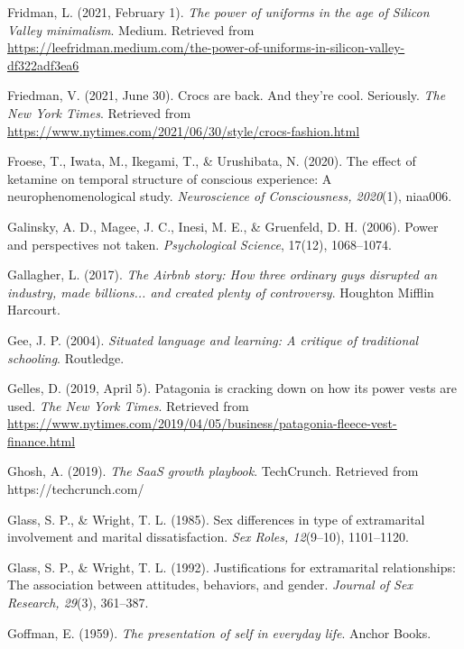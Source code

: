 \begin{thebibliography}{}
    Fridman, L. (2021, February 1). \textit{The power of uniforms in the age of Silicon Valley minimalism}. Medium. Retrieved from \url{https://leefridman.medium.com/the-power-of-uniforms-in-silicon-valley-df322adf3ea6}

    Friedman, V. (2021, June 30). Crocs are back. And they’re cool. Seriously. \textit{The New York Times}. Retrieved from \url{https://www.nytimes.com/2021/06/30/style/crocs-fashion.html}


    Froese, T., Iwata, M., Ikegami, T., \& Urushibata, N. (2020). The effect of ketamine on temporal structure of conscious experience: A neurophenomenological study. \textit{Neuroscience of Consciousness, 2020}(1), niaa006.

    
    Galinsky, A. D., Magee, J. C., Inesi, M. E., \& Gruenfeld, D. H. (2006). Power and perspectives not taken. \textit{Psychological Science}, 17(12), 1068–1074.

    Gallagher, L. (2017). \textit{The Airbnb story: How three ordinary guys disrupted an industry, made billions... and created plenty of controversy}. Houghton Mifflin Harcourt.
    
    Gee, J. P. (2004). \textit{Situated language and learning: A critique of traditional schooling}. Routledge.

    Gelles, D. (2019, April 5). Patagonia is cracking down on how its power vests are used. \textit{The New York Times}. Retrieved from \url{https://www.nytimes.com/2019/04/05/business/patagonia-fleece-vest-finance.html}

    Ghosh, A. (2019). \textit{The SaaS growth playbook}. TechCrunch. Retrieved from https://techcrunch.com/
    
    Glass, S. P., \& Wright, T. L. (1985). Sex differences in type of extramarital involvement and marital dissatisfaction. \textit{Sex Roles, 12}(9–10), 1101–1120.
    
    Glass, S. P., \& Wright, T. L. (1992). Justifications for extramarital relationships: The association between attitudes, behaviors, and gender. \textit{Journal of Sex Research, 29}(3), 361–387.
    
    Goffman, E. (1959). \textit{The presentation of self in everyday life}. Anchor Books.


\end{thebibliography}
